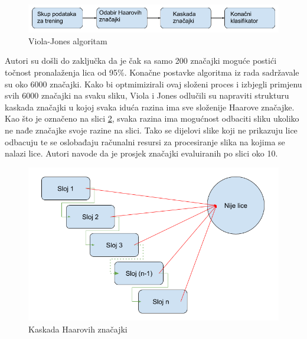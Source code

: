 \begin{figure}[htb]
	\centering
	\includegraphics[width=\linewidth]{img/Viola-Jones.png}
	\caption{Viola-Jones algoritam}
	\label{img:viola-jones}
\end{figure}

Autori su došli do zaključka da je čak sa samo 200 značajki moguće postići točnost pronalaženja lica od 95\%. Konačne postavke algoritma iz rada \citep{ViolaJones} sadržavale su oko 6000 značajki. Kako bi optmimizirali ovaj složeni proces i izbjegli primjenu svih 6000 značajki na svaku sliku, Viola i Jones odlučili su napraviti strukturu kaskada značajki u kojoj svaka iduća razina ima sve složenije Haarove značajke. Kao što je označeno na slici \ref{img:haar-cascades}, svaka razina ima mogućnost odbaciti sliku ukoliko ne nađe značajke svoje razine na slici. Tako se dijelovi slike koji ne prikazuju lice odbacuju te se oslobađaju računalni resursi za procesiranje slika na kojima se nalazi lice. Autori navode da je prosjek značajki evaluiranih po slici oko 10.

\begin{figure}[htb]
	\centering
	\includegraphics[width=\linewidth]{img/HaarCascades.png}
	\caption{Kaskada Haarovih značajki}
	\label{img:haar-cascades}
\end{figure}

